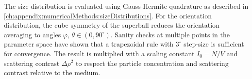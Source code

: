 \documentclass[\main/dresen_thesis.tex]{subfiles}
\begin{document}
The size distribution is evaluated using Gauss-Hermite quadrature as described in \ref{ch:appendix:numericalMethods:sizeDistributions}. 
For the orientation distribution, the cube symmetry of the superball reduces the orientation averaging to angles $\varphi,\, \theta \in (0, 90 ^\circ)$. 
Sanity checks at multiple points in the parameter space have shown that a trapezoidal rule with $3^{\circ}$ step-size is sufficient for convergence.
The result is multiplied with a scaling constant $I_0=N/V$ and scattering contrast $\Delta \rho^2$ to respect the particle concentration and scattering contrast relative to the medium.
\end{document}
